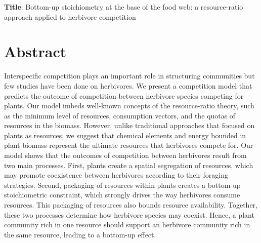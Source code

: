 \documentclass[12pt]{article}
\begin{document}
\begin{large}
\noindent \textbf{Title}: Bottom-up stoichiometry at the base of the food web: a resource-ratio approach applied to herbivore competition  
\end{large}

\section*{Abstract}


Interspecific competition plays an important role in structuring communities but few studies have been done on herbivores. We present a competition model that predicts the outcome of competition between herbivore species competing for plants. Our model imbeds well-known concepts of the resource-ratio theory, such as the minimum level of resources, consumption vectors, and the quotas of resources in the biomass. However, unlike traditional approaches that focused on plants as resources, we suggest that chemical elements and energy bounded in plant biomass represent the ultimate resources that herbivores compete for. Our model shows that the outcomes of competition between herbivores result from two main processes. First, plants create a spatial segregation of resources, which may promote coexistence between herbivores according to their foraging strategies. Second, packaging of resources within plants creates a bottom-up stoichiometric constraint, which strongly drives the way herbivores consume resources. This packaging of resources also bounds resource availability. Together, these two processes determine how herbivore species may coexist. Hence, a plant community rich in one resource should support an herbivore community rich in the same resource, leading to a bottom-up effect.
\end{document}
